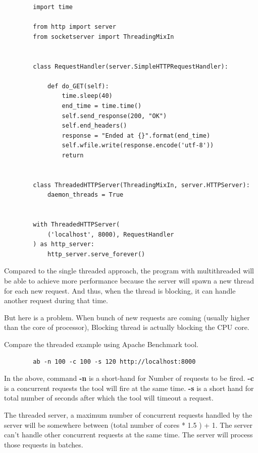 \documentclass{article}
\begin{document}
      \begin{verbatim}
        import time

        from http import server
        from socketserver import ThreadingMixIn


        class RequestHandler(server.SimpleHTTPRequestHandler):

            def do_GET(self):
                time.sleep(40)
                end_time = time.time()
                self.send_response(200, "OK")
                self.end_headers()
                response = "Ended at {}".format(end_time)
                self.wfile.write(response.encode('utf-8'))
                return


        class ThreadedHTTPServer(ThreadingMixIn, server.HTTPServer):
            daemon_threads = True


        with ThreadedHTTPServer(
            ('localhost', 8000), RequestHandler
        ) as http_server:
            http_server.serve_forever()
      \end{verbatim}

      Compared to the single threaded approach, the program with multithreaded
      will be able to achieve more performance because the server will spawn a
      new thread for each new request. And thus, when the thread is blocking,
      it can handle another request during that time.

      But here is a problem. When bunch of new requests are coming (usually
      higher than the core of processor), Blocking thread is actually blocking
      the CPU core.

      Compare the threaded example using Apache Benchmark tool.

      \begin{verbatim}
        ab -n 100 -c 100 -s 120 http://localhost:8000
      \end{verbatim}

      In the above, command \textbf{-n} is a short-hand for Number of requests
      to be fired. \textbf{-c} is a concurrent requests the tool will fire at
      the same time. \textbf{-s} is a short hand for total number of seconds
      after which the tool will timeout a request.

      The threaded server, a maximum number of concurrent requests handled by
      the server will be somewhere between (total number of cores * 1.5 ) + 1.
      The server can't handle other concurrent requests at the same time. The
      server will process those requests in batches.
\end{document}

